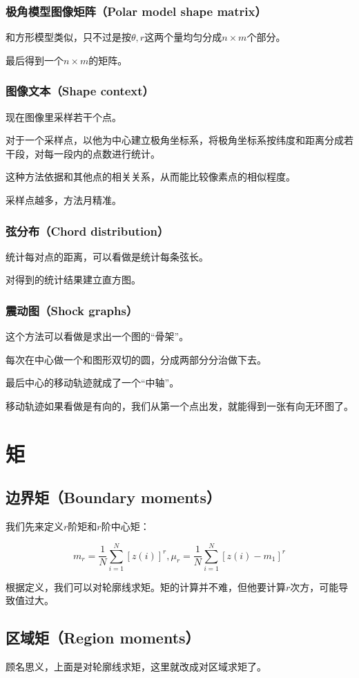 \documentclass{ctexart}
\begin{document}
\subsubsection{极角模型图像矩阵（Polar model shape matrix）}
和方形模型类似，只不过是按$\theta,r$这两个量均匀分成$n \times m$个部分。

最后得到一个$n \times m$的矩阵。
\subsubsection{图像文本（Shape context）}
现在图像里采样若干个点。

对于一个采样点，以他为中心建立极角坐标系，将极角坐标系按纬度和距离分成若干段，对每一段内的点数进行统计。

这种方法依据和其他点的相关关系，从而能比较像素点的相似程度。

采样点越多，方法月精准。
\subsubsection{弦分布（Chord distribution）}
统计每对点的距离，可以看做是统计每条弦长。

对得到的统计结果建立直方图。
\subsubsection{震动图（Shock graphs）}
这个方法可以看做是求出一个图的“骨架”。

每次在中心做一个和图形双切的圆，分成两部分分治做下去。

最后中心的移动轨迹就成了一个“中轴”。

移动轨迹如果看做是有向的，我们从第一个点出发，就能得到一张有向无环图了。
\section{矩}
\subsection{边界矩（Boundary moments）}
我们先来定义$r$阶矩和$r$阶中心矩：

\[m_r=\frac{1}{N}\sum_{i=1}^N[z(i)]^r,\mu_r=\frac{1}{N}\sum_{i=1}^N[z(i)-m_1]^r\]

根据定义，我们可以对轮廓线求矩。矩的计算并不难，但他要计算$r$次方，可能导致值过大。
\subsection{区域矩（Region moments）}
顾名思义，上面是对轮廓线求矩，这里就改成对区域求矩了。
\end{document}
